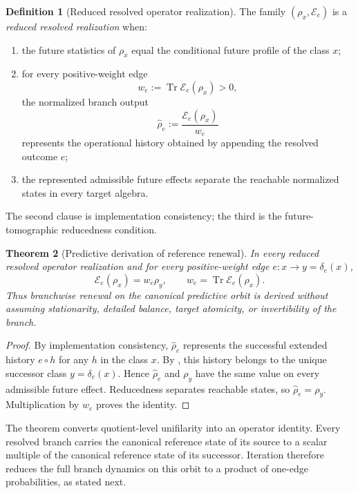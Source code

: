 \documentclass[11pt]{article}
\newtheorem{theorem}{Theorem}[section]
\theoremstyle{definition}
\newtheorem{definition}[theorem]{Definition}
\theoremstyle{remark}
\newcommand{\Tr}{\operatorname{Tr}}
\newcommand{\E}{\mathcal E}
\begin{document}
\begin{definition}[Reduced resolved operator realization]
\label{def:reduced-resolved-realization}
The family $(\rho_x,\E_e)$ is a \emph{reduced resolved realization} when:
\begin{enumerate}[label=\textup{(F\arabic*)},leftmargin=2.8em]
\item the future statistics of $\rho_x$ equal the conditional future profile of
      the class $x$;
\item for every positive-weight edge
      \[
       w_e:=\Tr\E_e(\rho_x)>0,
      \]
      the normalized branch output
      \[
       \widehat\rho_e:=\frac{\E_e(\rho_x)}{w_e}
      \]
      represents the operational history obtained by appending the resolved
      outcome $e$;
\item the represented admissible future effects separate the reachable
      normalized states in every target algebra.
\end{enumerate}
The second clause is implementation consistency; the third is the
future-tomographic reducedness condition.
\end{definition}

\begin{theorem}[Predictive derivation of reference renewal]
\label{thm:predictive-reference-renewal}
In every reduced resolved operator realization and for every positive-weight
edge $e:x\to y=\delta_e(x)$,
\[
 \boxed{
 \E_e(\rho_x)=w_e\rho_y,
 \qquad
 w_e=\Tr\E_e(\rho_x).}
\]
Thus branchwise renewal on the canonical predictive orbit is derived without
assuming stationarity, detailed balance, target atomicity, or invertibility of
the branch.
\end{theorem}

\begin{proof}
By implementation consistency, $\widehat\rho_e$ represents the successful
extended history $e\circ h$ for any $h$ in the class $x$.  By
, this history belongs to the unique
successor class $y=\delta_e(x)$.  Hence $\widehat\rho_e$ and $\rho_y$ have the
same value on every admissible future effect.  Reducedness separates reachable
states, so $\widehat\rho_e=\rho_y$.  Multiplication by $w_e$ proves the
identity.
\end{proof}

The theorem converts quotient-level unifilarity into an operator identity.  Every
resolved branch carries the canonical reference state of its source to a scalar
multiple of the canonical reference state of its successor.  Iteration therefore
reduces the full branch dynamics on this orbit to a product of one-edge
probabilities, as stated next.
\end{document}
